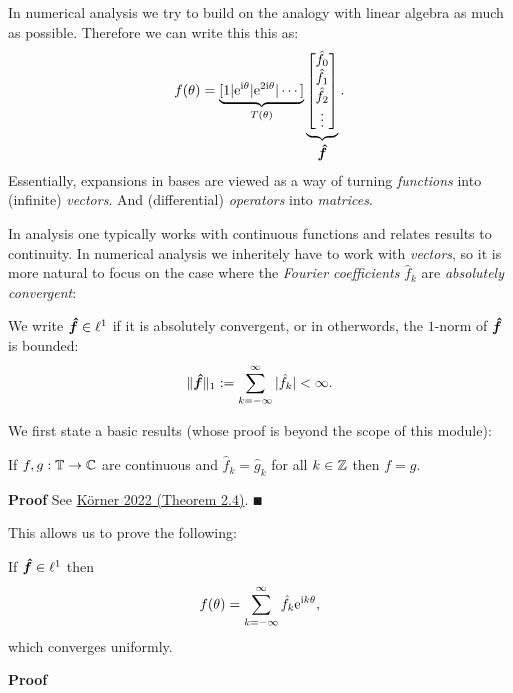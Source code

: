 In numerical analysis we try to build on the analogy with linear algebra as much as possible. Therefore we  can write this this as:
\[
f(\theta) = \underbrace{[1 | {\rm e}^{{\rm i}\theta} | {\rm e}^{2{\rm i}\theta} | \cdots]}_{T(\theta)}
\underbrace{\begin{bmatrix} \hat f_0 \\ \hat f_1 \\ \hat f_2 \\ \vdots \end{bmatrix}}_{{\mbox{\boldmath$\hat f$\unboldmath}}}.
\]
Essentially, expansions in bases are viewed as a way of turning \emph{functions} into (infinite) \emph{vectors}. And (differential) \emph{operators} into \emph{matrices}.

In analysis one typically works with continuous functions and relates results to continuity. In numerical analysis we inheritely have to work with \emph{vectors}, so it is more natural to  focus on the case where the \emph{Fourier coefficients} $\hat f_k$ are \emph{absolutely convergent}:

\begin{definition} We write ${\mbox{\boldmath$\hat f$\unboldmath}} \in \ell^1$ if it is absolutely convergent, or in otherwords, the $1$-norm of ${\mbox{\boldmath$\hat f$\unboldmath}}$ is bounded:
\[
\|{\mbox{\boldmath$\hat f$\unboldmath}}\|_1 := \sum_{k=-\infty}^\infty |\hat f_k| < \infty.
\]
\end{definition}

We first state a  basic results (whose proof is beyond the scope of this module):

\begin{theorem} If $f, g : {\mathbb T} \rightarrow {\mathbb C}$ are continuous and $\hat f_k = \hat g_k$ for all $k \in {\mathbb Z}$ then $f = g$.

\end{theorem}
\textbf{Proof} See \href{https://www.cambridge.org/core/books/fourier-analysis/5FD8F0FD69DDB139019655D7F8440D2F}{Körner 2022 (Theorem 2.4)}. \ensuremath{\QED}

This allows us to prove the following:

\begin{theorem} If ${\mbox{\boldmath$\hat f$\unboldmath}} \in \ell^1$ then
\[
f(\theta) = \sum_{k = -\infty}^\infty \hat f_k {\rm e}^{{\rm i} k \theta},
\]
which converges uniformly. \end{theorem}
\textbf{Proof}

